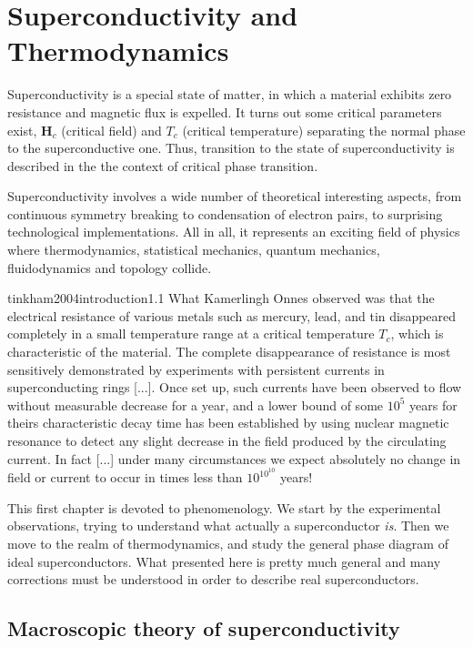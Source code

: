 \chapter{Superconductivity and Thermodynamics}\label{chap:superconductivity and thermodynamics}\chaptertoc{}

Superconductivity is a special state of matter, in which a material exhibits zero resistance and magnetic flux is expelled. It turns out some critical parameters exist, $\mathbf{H}_c$ (critical field) and $T_c$ (critical temperature) separating the normal phase to the superconductive one. Thus, transition to the state of superconductivity is described in the the context of critical phase transition.

Superconductivity involves a wide number of theoretical interesting aspects, from continuous symmetry breaking to condensation of electron pairs, to surprising technological implementations. All in all, it represents an exciting field of physics where thermodynamics, statistical mechanics, quantum mechanics, fluidodynamics and topology collide.

\begin{cit}{tinkham2004introduction}{1.1}
    What Kamerlingh Onnes observed was that the electrical resistance of various metals such as mercury, lead, and tin disappeared completely in a small temperature range at a critical temperature $T_c$, which is characteristic of the material. The complete disappearance of resistance is most sensitively demonstrated by experiments with persistent currents in superconducting rings [...]. Once set up, such currents have been observed to flow without measurable decrease for a year, and a lower bound of some $10^5$ years for theirs characteristic decay time has been established by using nuclear magnetic resonance to detect any slight decrease in the field produced by the circulating current. In fact [...] under many circumstances we expect absolutely no change in field or current to occur in times less than $10^{10^10}$ years!
\end{cit}

This first chapter is devoted to phenomenology. We start by the experimental observations, trying to understand what actually a superconductor \textit{is}. Then we move to the realm of thermodynamics, and study the general phase diagram of ideal superconductors. What presented here is pretty much general and many corrections must be understood in order to describe real superconductors.

\section{Macroscopic theory of superconductivity}

